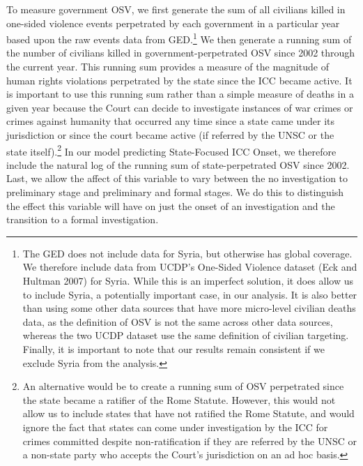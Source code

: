 To measure government OSV, we first generate the sum of all civilians killed in one-sided violence events perpetrated by each government in a particular year based upon the raw events data from GED.\footnote{The GED does not include data for Syria, but otherwise has global coverage. We therefore include data from UCDP's One-Sided Violence dataset (Eck and Hultman 2007) for Syria. While this is an imperfect solution, it does allow us to include Syria, a potentially important case, in our analysis. It is also better than using some other data sources that have more micro-level civilian deaths data, as the definition of OSV is not the same across other data sources, whereas the two UCDP dataset use the same definition of civilian targeting. Finally, it is important to note that our results remain consistent if we exclude Syria from the analysis.} We then generate a running sum of the number of civilians killed in government-perpetrated OSV since 2002 through the current year. This running sum provides a measure of the magnitude of human rights violations perpetrated by the state since the ICC became active. It is important to use this running sum rather than a simple measure of deaths in a given year because the Court can decide to investigate instances of war crimes or crimes against humanity that occurred any time since a state came under its jurisdiction or since the court became active (if referred by the UNSC or the state itself).\footnote{An alternative would be to create a running sum of OSV perpetrated since the state became a ratifier of the Rome Statute. However, this would not allow us to include states that have not ratified the Rome Statute, and would ignore the fact that states can come under investigation by the ICC for crimes committed despite non-ratification if they are referred by the UNSC or a non-state party who accepts the Court's jurisdiction on an ad hoc basis.} In our model predicting State-Focused ICC Onset, we therefore include the natural log of the running sum of state-perpetrated OSV since 2002. Last, we allow the affect of this variable to vary between the no investigation to preliminary stage and preliminary and formal stages. We do this to distinguish the effect this variable will have on just the onset of an investigation and the transition to a formal investigation. 

